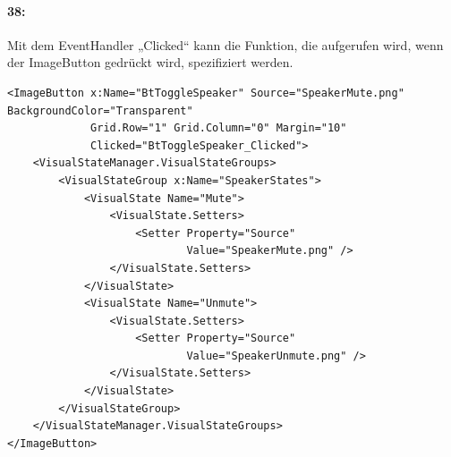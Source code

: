 \paragraph{38:} Mit dem EventHandler „Clicked“ kann die Funktion, die aufgerufen wird, wenn der ImageButton gedrückt wird, spezifiziert werden.
\begin{verbatim}
<ImageButton x:Name="BtToggleSpeaker" Source="SpeakerMute.png" BackgroundColor="Transparent"
             Grid.Row="1" Grid.Column="0" Margin="10"
             Clicked="BtToggleSpeaker_Clicked">
    <VisualStateManager.VisualStateGroups>
        <VisualStateGroup x:Name="SpeakerStates">
            <VisualState Name="Mute">
                <VisualState.Setters>
                    <Setter Property="Source"
                            Value="SpeakerMute.png" />
                </VisualState.Setters>
            </VisualState>
            <VisualState Name="Unmute">
                <VisualState.Setters>
                    <Setter Property="Source"
                            Value="SpeakerUnmute.png" />
                </VisualState.Setters>
            </VisualState>
        </VisualStateGroup>
    </VisualStateManager.VisualStateGroups>
</ImageButton>
\end{verbatim}
